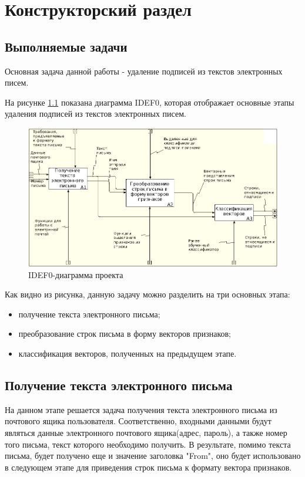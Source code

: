 \chapter{Конструкторский раздел}
\label{cha:design}

\section{Выполняемые задачи}

Основная задача данной работы - удаление подписей из текстов электронных писем.

На рисунке \ref{design:idef_0} показана диаграмма IDEF0, которая отображает основные этапы удаления подписей из текстов электронных писем.

\begin{figure}[h!]
	\centering
	\includegraphics[width=\textwidth]{inc/img/idef_0.png}
	\caption{IDEF0-диаграмма проекта}
	\label{design:idef_0}
\end{figure}

Как видно из рисунка, данную задачу можно разделить на три основных этапа:

\begin{itemize}
	\item получение текста электронного письма;
	\item преобразование строк письма в форму векторов признаков;
	\item классификация векторов, полученных на предыдущем этапе.
\end{itemize}

\newpage
\section{Получение текста электронного письма}
На данном этапе решается задача получения текста электронного письма из почтового ящика пользователя. Соответственно, входными данными будут являться данные электронного почтового ящика(адрес, пароль), а также номер того письма, текст которого необходимо получить. В результате, помимо текста письма, будет получено еще и значение заголовка "From", оно будет использовано в следующем этапе для приведения строк письма к формату вектора признаков. 

